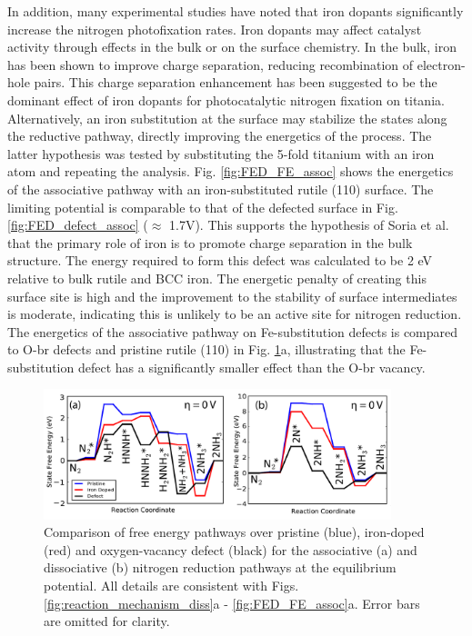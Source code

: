 \documentclass[journal=ascecg,manuscript=article,articletitle=true]{achemso}
\begin{document}
In addition, many experimental studies have noted that iron dopants significantly increase the nitrogen photofixation rates.\cite{Schrauzer_1977,Schrauzer_1983,Augugliaro_1982,Soria_1991} Iron dopants may affect catalyst activity through effects in the bulk or on the surface chemistry. In the bulk, iron has been shown to improve charge separation, reducing recombination of electron-hole pairs. This charge separation enhancement has been suggested to be the dominant effect of iron dopants for photocatalytic nitrogen fixation on titania. \cite{Soria_1991} Alternatively, an iron substitution at the surface may stabilize the states along the reductive pathway, directly improving the energetics of the process. The latter hypothesis was tested by substituting the 5-fold titanium with an iron atom and repeating the analysis. Fig. \ref{fig:FED_FE_assoc} shows the energetics of the associative pathway with an iron-substituted rutile (110) surface. The limiting potential is comparable to that of the defected surface in Fig. \ref{fig:FED_defect_assoc} ($\approx$ 1.7V). This supports the hypothesis of Soria et al.\cite{Soria_1991} that the primary role of iron is to promote charge separation in the bulk structure. The energy required to form this defect was calculated to be 2 eV relative to bulk rutile and BCC iron. The energetic penalty of creating this surface site is high and the improvement to the stability of surface intermediates is moderate, indicating this is unlikely to be an active site for nitrogen reduction. The energetics of the associative pathway on Fe-substitution defects is compared to O-br defects and pristine rutile (110) in Fig. \ref{fig:defect_effects}a, illustrating that the Fe-substitution defect has a significantly smaller effect than the O-br vacancy.

\begin{figure}
\includegraphics[width=0.9\textwidth]{figures/defect_effects.pdf}
\caption{Comparison of free energy pathways over pristine (blue), iron-doped (red) and oxygen-vacancy defect (black) for the associative (a) and dissociative (b) nitrogen reduction pathways at the equilibrium potential. All details are consistent with Figs. \ref{fig:reaction_mechanism_diss}a - \ref{fig:FED_FE_assoc}a. Error bars are omitted for clarity.}
\label{fig:defect_effects}
\end{figure}
\end{document}
